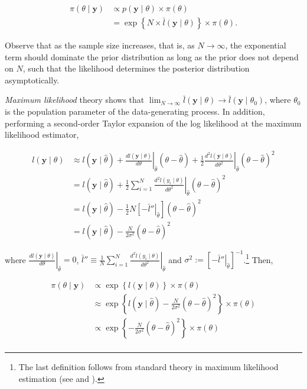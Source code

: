 \begin{align}
	\pi(\theta\mid \mathbf{y})&\propto p(\mathbf{y}\mid \theta) \times \pi(\theta)\nonumber\\
	&=\exp\left\{N\times \bar{l}(\mathbf{y}\mid \theta)\right\} \times \pi(\theta).
\end{align}

Observe that as the sample size increases, that is, as $N \to \infty$, the exponential term should dominate the prior distribution as long as the prior does not depend on $N$, such that the likelihood determines the posterior distribution asymptotically.

\textit{Maximum likelihood} theory shows that $\lim_{N \to \infty} \bar{l}(\mathbf{y} \mid \theta) \to \bar{l}(\mathbf{y} \mid \theta_0)$, where $\theta_0$ is the population parameter of the data-generating process. In addition, performing a second-order Taylor expansion of the log likelihood at the maximum likelihood estimator,

\begin{align*}
	l(\mathbf{y}\mid \theta)&\approx l(\mathbf{y}\mid \hat{\theta})+\left.\frac{dl(\mathbf{y}\mid {\theta})}{d\theta}\right\vert_{\hat{\theta}}(\theta-\hat{\theta})+\frac{1}{2}\left.\frac{d^2l(\mathbf{y}\mid {\theta})}{d\theta^2}\right\vert_{\hat{\theta}}(\theta-\hat{\theta})^2\\
	&= l(\mathbf{y}\mid \hat{\theta})+\frac{1}{2}\left.\sum_{i=1}^N\frac{d^2l(y_i\mid {\theta})}{d\theta^2}\right\vert_{\hat{\theta}}(\theta-\hat{\theta})^2\\
	&= l(\mathbf{y}\mid \hat{\theta})-\frac{1}{2}\left.N\left[-\bar{l}''\right\vert_{\hat{\theta}}\right](\theta-\hat{\theta})^2\\ 
	&= l(\mathbf{y}\mid \hat{\theta})-\frac{N}{2\sigma^2}(\theta-\hat{\theta})^2 
\end{align*}

where $\left.\frac{dl(\mathbf{y}\mid \theta)}{d\theta}\right\vert_{\hat{\theta}}=0$, $\bar{l}''\equiv\frac{1}{N}\left.\sum_{i=1}^N\frac{d^2l(y_i\mid {\theta})}{d\theta^2}\right\vert_{\hat{\theta}}$ and $\sigma^2:=\left[\left.-\bar{l}''\right\vert_{\hat{\theta}}\right]^{-1}$.\footnote{The last definition follows from standard theory in maximum likelihood estimation (see \cite[Chap. ~10]{casella2024statistical} and \cite[Chap. ~13]{wooldridge2010econometric}).} Then,

\begin{align*}
	\pi(\theta\mid \mathbf{y})&\propto \exp\left\{{l}(\mathbf{y}\mid \theta)\right\} \times \pi(\theta)\\
	&\approx \exp\left\{l(\mathbf{y}\mid \hat{\theta})-\frac{N}{2\sigma^2}(\theta-\hat{\theta})^2\right\} \times \pi(\theta)\\
	&\propto \exp\left\{-\frac{N}{2\sigma^2}(\theta-\hat{\theta})^2\right\} \times \pi(\theta)\\ 
\end{align*}

